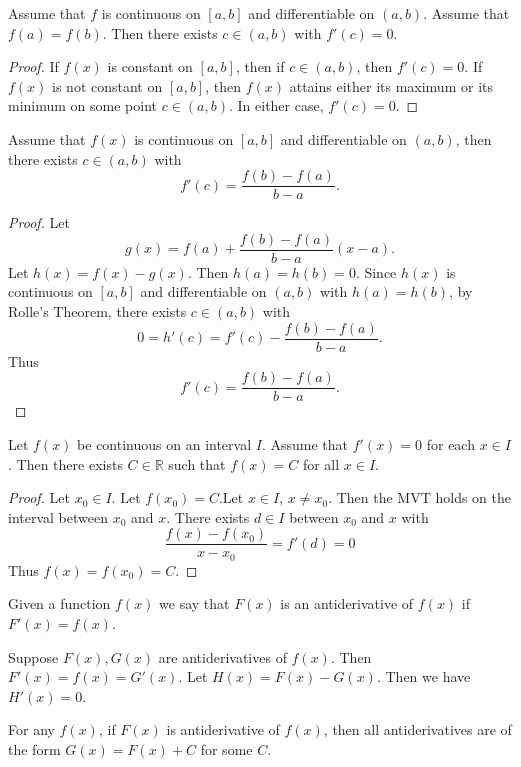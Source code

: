 
\begin{thm}
Assume that $f$ is continuous on $[a,b]$ and differentiable on $(a,b)$. Assume that $f(a) = f(b)$. Then there exists $c\in (a,b)$ with $f'(c) = 0$.
\end{thm}

\begin{proof}
If $f(x)$ is constant on $[a,b]$, then if $c\in (a,b)$, then $f'(c) = 0$. If $f(x)$ is not constant on $[a,b]$, then $f(x)$ attains either its maximum or its minimum on some point $c\in (a,b)$. In either case, $f'(c)=  0$.
\end{proof}

\begin{thm}
Assume that $f(x)$ is continuous on $[a,b]$ and differentiable on $(a,b)$, then there exists $c\in (a,b)$ with \[f'(c) = \frac{f(b) - f(a)}{b-a}.\]
\end{thm}

\begin{proof}
Let \[g(x) = f(a) + \frac{f(b)-f(a)}{b-a}(x-a).\] Let $h(x) = f(x) - g(x)$. Then $h(a) = h(b) = 0$. Since $h(x)$ is continuous on $[a,b]$ and differentiable on $(a,b)$ with $h(a) = h(b)$, by Rolle's Theorem, there exists $c \in (a,b)$ with \[0 = h'(c) = f'(c) - \frac{f(b) - f(a)}{b-a}.\] Thus \[f'(c) = \frac{f(b) - f(a)}{b-a}.\]
\end{proof}

\begin{prop}
Let $f(x)$ be continuous on an interval $I$. Assume that $f'(x) = 0$ for each $x \in I$. Then there exists $C \in \mathbb{R}$ such that $f(x) = C$ for all $x\in I$.
\end{prop}

\begin{proof}
Let $x_0 \in I$. Let $f(x_0) = C$.Let $x\in I$, $x\neq x_0$. Then the MVT holds on the interval between $x_0$ and $x$. There exists $d \in I$ between $x_0$ and $x$ with \[\frac{f(x)-f(x_0)}{x-x_0} = f'(d) = 0\] Thus $f(x) = f(x_0) = C$.
\end{proof}

\begin{defn}[Antiderivatives]
Given a function $f(x)$ we say that $F(x)$ is an antiderivative of $f(x)$ if $F'(x) = f(x)$.
\end{defn}

\begin{note}
Suppose $F(x),G(x)$ are antiderivatives of $f(x)$. Then $F'(x) = f(x) = G'(x)$. Let $H(x) = F(x) - G(x)$. Then we have $H'(x) = 0$.

For any $f(x)$, if $F(x)$ is antiderivative of $f(x)$, then all antiderivatives are of the form $G(x) = F(x)+C$ for some $C$.
\end{note}


